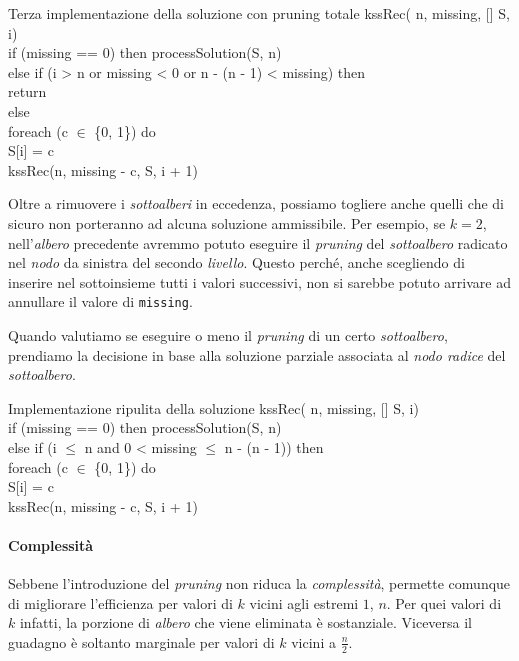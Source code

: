 \begin{minicode}{Terza implementazione della soluzione con pruning totale}
\ind kssRec( n,  missing, [] S,  i)\\
    \indf if (missing == 0) then\hfill{}
        processSolution(S, n)\\
    \indf else if (i > n or missing < 0 or n - (n - 1) < missing) then\\
        return\\
    \indf else\\
        \indff foreach (c $\in$ \{0, 1\}) do\\
            S[i] = c\\
            kssRec(n, missing - c, S, i + 1)
\end{minicode}

\noindent
Oltre a rimuovere i \emph{sottoalberi} in eccedenza, possiamo togliere anche
quelli che di sicuro non porteranno ad alcuna soluzione ammissibile. Per esempio,
se $k=2$, nell'\emph{albero} precedente avremmo potuto eseguire il \emph{pruning}
del \emph{sottoalbero} radicato nel \emph{nodo} da sinistra del secondo
\emph{livello}. Questo perché, anche scegliendo di inserire nel sottoinsieme
tutti i valori successivi, non si sarebbe potuto arrivare ad annullare il valore
di \texttt{missing}.

\begin{note}
    Quando valutiamo se eseguire o meno il \emph{pruning} di un certo
    \emph{sottoalbero}, prendiamo la decisione in base alla soluzione parziale
    associata al \emph{nodo radice} del \emph{sottoalbero}.
\end{note}

\begin{minicode}{Implementazione ripulita della soluzione}
\ind kssRec( n,  missing, [] S,  i)\\
    \indf if (missing == 0) then\hfill{}
        processSolution(S, n)\\
    \indf else if (i $\leq$ n and 0 < missing $\leq$ n - (n - 1)) then\\
        \indff foreach (c $\in$ \{0, 1\}) do\\
            S[i] = c\\
            kssRec(n, missing - c, S, i + 1)
\end{minicode}

\paragraph{Complessità}
Sebbene l'introduzione del \emph{pruning} non riduca la \emph{complessità},
permette comunque di migliorare l'efficienza per valori di $k$ vicini agli
estremi $1$, $n$. Per quei valori di $k$ infatti, la porzione di \emph{albero}
che viene eliminata è sostanziale. Viceversa il guadagno è soltanto marginale
per valori di $k$ vicini a $\frac{n}{2}$.

